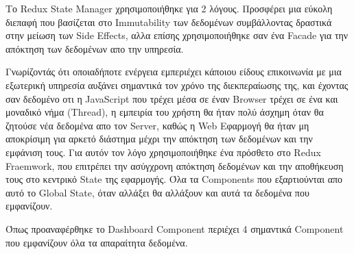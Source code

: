 Το Redux State Manager χρησιμοποιήθηκε για 2 λόγους. Προσφέρει μια εύκολη διεπαφή που βασίζεται στο Immutability των δεδομένων συμβάλλοντας δραστικά στην μείωση των Side Effects, αλλα επίσης χρησιμοποιήθηκε σαν ένα Facade για την απόκτηση των δεδομένων απο την υπηρεσία.

Γνωρίζοντάς ότι οποιαδήποτε ενέργεια εμπεριέχει κάποιου είδους επικοινωνία με μια εξωτερική υπηρεσία αυξάνει σημαντικά τον χρόνο της διεκπεραίωσης της, και έχοντας σαν δεδομένο οτι η JavaScript που τρέχει μέσα σε έναν Browser τρέχει σε ένα και μοναδικό νήμα (Thread), η εμπειρία του χρήστη θα ήταν πολύ άσχημη όταν θα ζητούσε νέα δεδομένα απο τον Server, καθώς η Web Εφαρμογή θα ήταν μη αποκρίσιμη για αρκετό διάστημα μέχρι την απόκτηση των δεδομένων και την εμφάνιση τους. Για αυτόν τον λόγο χρησιμοποιήθηκε ένα πρόσθετο στο Redux Fraemwork, που επιτρέπει την ασύγχρονη απόκτηση δεδομένων και την αποθήκευση τους στο κεντρικό State της εφαρμογής. Όλα τα Components που εξαρτιούνται απο αυτό το Global State, όταν αλλάξει θα αλλάξουν και αυτά τα δεδομένα που εμφανίζουν.

Όπως προαναφέρθηκε το Dashboard Component περιέχει 4 σημαντικά Component που εμφανίζουν όλα τα απαραίτητα δεδομένα.




